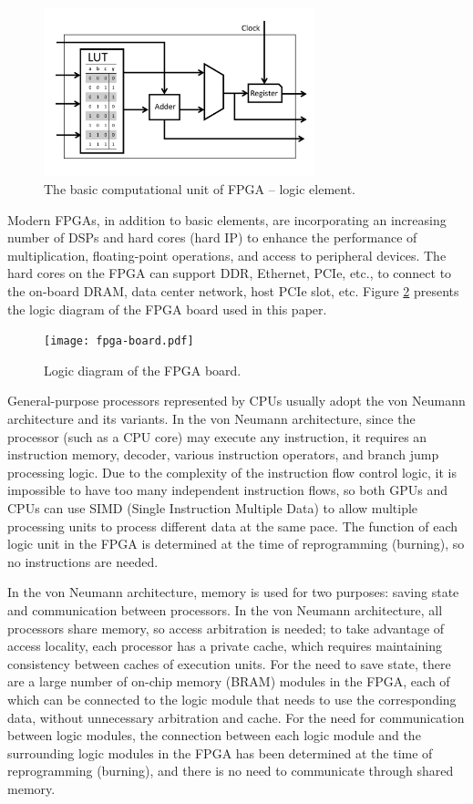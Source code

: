 \begin{figure}[htbp]
	\centering
	\includegraphics[width=0.7\textwidth]{chapters/clicknp/image/logic-block.pdf}
	\caption{The basic computational unit of FPGA -- logic element.}
	\label{clicknp:fig:logic-block}
\end{figure}

Modern FPGAs, in addition to basic elements, are incorporating an increasing number of DSPs and hard cores (hard IP) to enhance the performance of multiplication, floating-point operations, and access to peripheral devices. The hard cores on the FPGA can support DDR, Ethernet, PCIe, etc., to connect to the on-board DRAM, data center network, host PCIe slot, etc. Figure \ref{clicknp:fig:fpga} presents the logic diagram of the FPGA board used in this paper.

\begin{figure}[htbp]
	\centering
	\texttt{[image: fpga-board.pdf]}
	\caption{Logic diagram of the FPGA board.}
	\label{clicknp:fig:fpga}
\end{figure}

General-purpose processors represented by CPUs usually adopt the von Neumann architecture and its variants. In the von Neumann architecture, since the processor (such as a CPU core) may execute any instruction, it requires an instruction memory, decoder, various instruction operators, and branch jump processing logic. Due to the complexity of the instruction flow control logic, it is impossible to have too many independent instruction flows, so both GPUs and CPUs can use SIMD (Single Instruction Multiple Data) to allow multiple processing units to process different data at the same pace. The function of each logic unit in the FPGA is determined at the time of reprogramming (burning), so no instructions are needed.

In the von Neumann architecture, memory is used for two purposes: saving state and communication between processors. In the von Neumann architecture, all processors share memory, so access arbitration is needed; to take advantage of access locality, each processor has a private cache, which requires maintaining consistency between caches of execution units. For the need to save state, there are a large number of on-chip memory (BRAM) modules in the FPGA, each of which can be connected to the logic module that needs to use the corresponding data, without unnecessary arbitration and cache. For the need for communication between logic modules, the connection between each logic module and the surrounding logic modules in the FPGA has been determined at the time of reprogramming (burning), and there is no need to communicate through shared memory.

